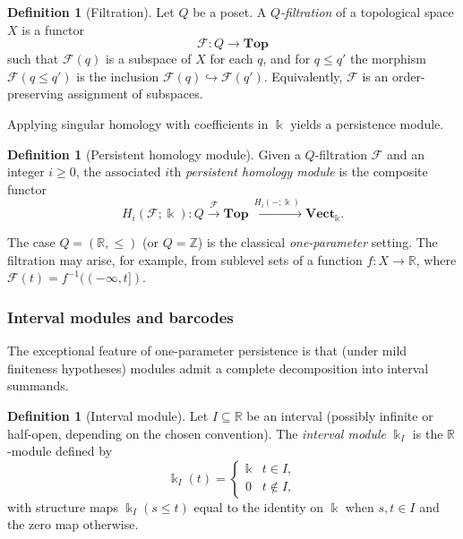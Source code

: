 \documentclass{article}
\newcommand{\kk}{\Bbbk}
\newcommand{\<}{\langle}
\renewcommand{\>}{\rangle}
\newcommand{\bbb}[1]{\ensuremath{\mathbb{#1}}}
\theoremstyle{definition}
\newtheorem{defn}[theorem]{Definition}
\theoremstyle{remark}
\begin{document}
	\begin{defn}[Filtration]\label{def:filtration}
		Let $Q$ be a poset.  A \emph{$Q$-filtration} of a topological space $X$ is a functor
		\[
		\mathcal{F}\colon Q\longrightarrow \mathbf{Top}
		\]
		such that $\mathcal{F}(q)$ is a subspace of $X$ for each $q$, and for $q\leq q'$ the
		morphism $\mathcal{F}(q\leq q')$ is the inclusion $\mathcal{F}(q)\hookrightarrow
		\mathcal{F}(q')$.  Equivalently, $\mathcal{F}$ is an order-preserving assignment of
		subspaces.
	\end{defn}
	
	Applying singular homology with coefficients in $\kk$ yields a persistence module.
	
	\begin{defn}[Persistent homology module]\label{def:persistent-homology-module}
		Given a $Q$-filtration $\mathcal{F}$ and an integer $i\geq 0$, the associated
		$i$th \emph{persistent homology module} is the composite functor
		\[
		H_i(\mathcal{F};\kk)\colon Q \xrightarrow{\ \mathcal{F}\ } \mathbf{Top}
		\xrightarrow{\ H_i(-;\kk)\ } \mathbf{Vect}_{\kk}.
		\]
	\end{defn}
	
	The case $Q=(\bbb{R},\leq)$ (or $Q=\bbb{Z}$) is the classical \emph{one-parameter}
	setting.  The filtration may arise, for example, from sublevel sets of a function
	$f\colon X\to \bbb{R}$, where $\mathcal{F}(t)=f^{-1}((-\infty,t])$.
	
	\subsubsection*{Interval modules and barcodes}
	
	The exceptional feature of one-parameter persistence is that (under mild finiteness
	hypotheses) modules admit a complete decomposition into interval summands.
	
	\begin{defn}[Interval module]\label{def:interval-module}
		Let $I\subseteq \bbb{R}$ be an interval (possibly infinite or half-open, depending on
		the chosen convention).  The \emph{interval module} $\kk_I$ is the $\bbb{R}$-module
		defined by
		\[
		\kk_I(t)=
		\begin{cases}
			\kk & t\in I,\\
			0 & t\notin I,
		\end{cases}
		\]
		with structure maps $\kk_I(s\leq t)$ equal to the identity on $\kk$ when $s,t\in I$
		and the zero map otherwise.
	\end{defn}
	
\end{document}
